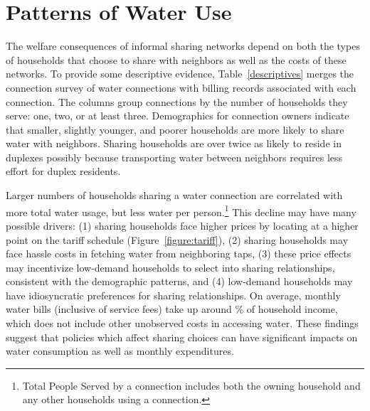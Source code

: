 \documentclass[12pt]{article}
\begin{document}


\section{Patterns of Water Use}\label{section:patternsofwateruse}

The welfare consequences of informal sharing networks depend on both the types of households that choose to share with neighbors as well as the costs of these networks.  To provide some descriptive evidence, Table~\ref{descriptives} merges the connection survey of water connections with billing records associated with each connection.  The columns group connections by the number of households they serve: one, two, or at least three.  Demographics for connection owners indicate that smaller, slightly younger, and poorer households are more likely to share water with neighbors.  Sharing households are over twice as likely to reside in duplexes possibly because transporting water between neighbors requires less effort for duplex residents.

Larger numbers of households sharing a water connection are correlated with more total water usage, but less water per person.\footnote{Total People Served by a connection includes both the owning household and any other households using a connection.}  This decline may have many possible drivers: (1) sharing households face higher prices by locating at a higher point on the tariff schedule (Figure~\ref{figure:tariff}), (2) sharing households may face hassle costs in fetching water from neighboring taps, (3) these price effects may incentivize low-demand households to select into sharing relationships, consistent with the demographic patterns, and (4) low-demand households may have idiosyncratic preferences for sharing relationships.  On average, monthly water bills (inclusive of service fees) take up around \unskip\% of household income, which does not include other unobserved costs in accessing water.  These findings suggest that policies which affect sharing choices can have significant impacts on water consumption as well as monthly expenditures.

\end{document}
